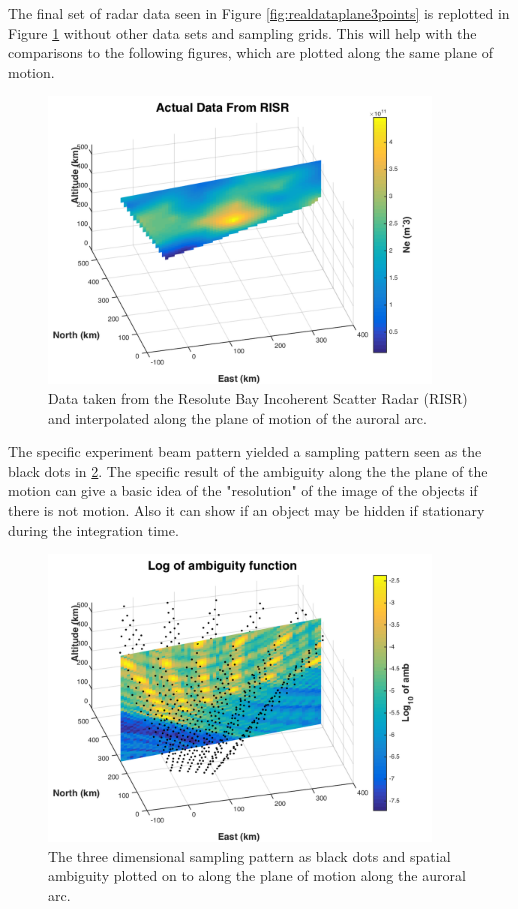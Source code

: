The final set of radar data seen in Figure \ref{fig:realdataplane3points} is replotted in Figure \ref{fig:realdataplane} without other data sets and sampling grids. This will help with the comparisons to the following figures, which are plotted along the same plane of motion.

\begin{figure}[h!]
	\centering
	\includegraphics[width=4in]{acdata}
	\caption{Data taken from the Resolute Bay Incoherent Scatter Radar (RISR) and interpolated along the plane of motion of the auroral arc.}
	\label{fig:realdataplane}
\end{figure}

The specific experiment beam pattern yielded a sampling pattern seen as the black dots in \ref{fig:rambplane}. The specific result of the ambiguity along the the plane of the motion can give a basic idea of the "resolution" of the image of the objects if there is not motion. Also it can show if an object may be hidden if stationary during the integration time.

\begin{figure}[h!]
	\centering
	\includegraphics[width=4in]{ambplane}
	\caption{The three dimensional sampling pattern as black dots and spatial ambiguity plotted on to along the plane of motion along the auroral arc.}
	\label{fig:rambplane}
\end{figure}

